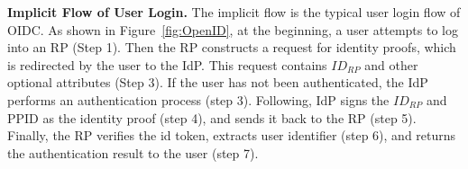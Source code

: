 \vspace{1mm}\noindent\textbf{Implicit Flow of User Login.}
The implicit flow is the typical user login flow of OIDC.
As shown in Figure~\ref{fig:OpenID},
at the beginning, a user attempts to log into an RP (Step 1).
Then the RP constructs a request for identity proofs,
 which is redirected by the user to the IdP.
This request contains $ID_{RP}$ and other optional attributes (Step 3).
If the user has not been authenticated, the IdP performs an authentication process (step 3). Following, IdP signs the $ID_{RP}$ and PPID as the identity proof (step 4), and sends it back to the RP (step 5). Finally, the RP verifies the id token, extracts user identifier (step 6), and returns the authentication result to the user (step 7).

